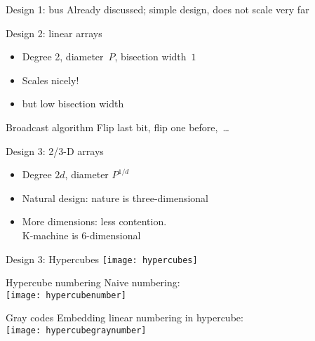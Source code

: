 \begin{numberedframe}{Design 1: bus}
  Already discussed; simple design, does not scale very far
\end{numberedframe}

\begin{numberedframe}{Design 2: linear arrays}
  \begin{itemize}
  \item Degree 2, diameter~$P$, bisection width~$1$
  \item Scales nicely!
  \item but low bisection width
  \end{itemize}
\end{numberedframe}

\begin{exercise}{Broadcast algorithm}
  Flip last bit, flip one before,~\ldots
\end{exercise}

\begin{numberedframe}{Design 3: 2/3-D arrays}
  \begin{itemize}
  \item Degree $2d$, diameter $P^{1/d}$
  \item Natural design: nature is three-dimensional
  \item More dimensions: less contention.\\ K-machine is 6-dimensional
  \end{itemize}
\end{numberedframe}

\begin{numberedframe}{Design 3: Hypercubes}
  \texttt{[image: hypercubes]}
\end{numberedframe}

\begin{numberedframe}{Hypercube numbering}
  Naive numbering:\\
  \texttt{[image: hypercubenumber]}
\end{numberedframe}

\begin{numberedframe}{Gray codes}
    Embedding linear numbering in hypercube:\\
  \texttt{[image: hypercubegraynumber]}
\end{numberedframe}

